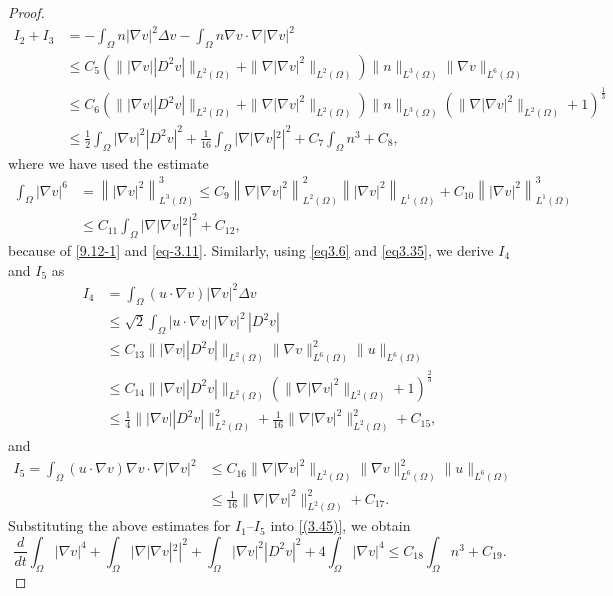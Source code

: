 \documentclass[10pt,a4paper]{amsart}
\numberwithin{equation}{section}
\begin{document}
\begin{proof}
\begin{align*}
I_2 + I_3 &=- \int_{\Omega} n |\nabla v|^2 \Delta v
  - \int_{\Omega} n \nabla v \cdot \nabla |\nabla v|^2\\
&\leq C_5\left(\||\nabla v| |D^2 v|\|_{L^2(\Omega)}+\|\nabla|\nabla v|^2\|_{L^2(\Omega)}\right)\|n\|_{L^3(\Omega)}\|\nabla v\|_{L^6(\Omega)}\\
&\leq C_6\left(\||\nabla v| |D^2 v|\|_{L^2(\Omega)}+\|\nabla|\nabla v|^2\|_{L^2(\Omega)}\right)\|n\|_{L^3(\Omega)}\left(\|\nabla|\nabla v|^2\|_{L^2(\Omega)}+1\right)^{\frac{1}{3}}
\\
&\leq \frac{1}{2} \int_{\Omega} |\nabla v|^2 |D^2 v|^2 +\frac{1}{16}\int_{\Omega} |\nabla |\nabla v|^2|^2  + C_7 \int_{\Omega} n^3+C_8,
\end{align*}
where we have used the estimate
\begin{equation}\label{eq3.35}
\begin{aligned}
\int_{\Omega} |\nabla v|^6 &= \left\| |\nabla v|^2 \right\|_{L^3(\Omega)}^3 
\leq C_{9} \left\| \nabla |\nabla v|^2 \right\|_{L^2(\Omega)}^2 \left\| |\nabla v|^2
\right\|_{L^1(\Omega)} + C_{10} \left\| |\nabla v|^2 \right\|_{L^1(\Omega)}^3 \\
&\leq C_{11} \int_{\Omega} |\nabla |\nabla v|^2|^2 + C_{12},
\end{aligned}
\end{equation}
because of \eqref{9.12-1} and \eqref{eq-3.11}. 
Similarly, using \eqref{eq3.6} and \eqref{eq3.35}, we derive $I_4$ and $I_5$ as
\begin{align*}
I_4 &= \int_{\Omega} (u \cdot \nabla v) |\nabla v|^2 \Delta v\\
&\leq \sqrt{2} \int_{\Omega} |u \cdot \nabla v| \, |\nabla v|^2 \, |D^2 v| \\
&\leq C_{13} \||\nabla v| |D^2 v|\|_{L^2(\Omega)}\|\nabla v\|^2_{L^6(\Omega)}\|u\|_{L^6(\Omega)}\\
&\leq C_{14} \||\nabla v| |D^2 v|\|_{L^2(\Omega)}\left(\|\nabla|\nabla v|^2\|_{L^2(\Omega)}+1\right)^{\frac{2}{3}}\\
&\leq \frac{1}{4} \||\nabla v|  |D^2 v|\|_{L^2(\Omega)}^2 + \frac{1}{16}\| \nabla |\nabla v|^2 \|_{L^2(\Omega)}^2 + C_{15},
\end{align*}
and
\begin{align*}
I_5 = \int_{\Omega} (u \cdot \nabla v) \nabla v \cdot \nabla|\nabla v|^2
&\leq C_{16}\|\nabla|\nabla v|^2\|_{L^2(\Omega)}\|\nabla v\|_{L^6(\Omega)}^2\|u\|_{L^6(\Omega)} \\
&\leq \frac{1}{16} \|\nabla|\nabla v|^2\|_{L^2(\Omega)}^2+ C_{17}.
\end{align*}
Substituting the above estimates for $I_1$--$I_5$ into \eqref{(3.45)}, we obtain
\begin{equation}\label{(3.48)}
\frac{d}{dt} \int_{\Omega} |\nabla v|^4
+  \int_{\Omega} |\nabla |\nabla v|^2|^2
+ \int_{\Omega} |\nabla v|^2 |D^2 v|^2
+ 4\int_{\Omega} |\nabla v|^4\leq  C_{18} \int_{\Omega} n^3 +C_{19}.
\end{equation}


\end{proof}
\end{document}
